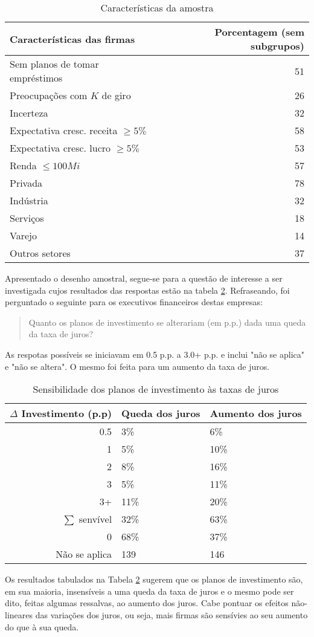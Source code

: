 \documentclass[11pt]{article}
\begin{document}
\begin{table}[htbp]
\caption{\label{tab:amostra}Características da amostra}
\centering
\begin{tabular}{lr}
\hline
Características das firmas & Porcentagem (sem subgrupos)\\
\hline
Sem planos de tomar empréstimos & 51\\
Preocupações com \(K\) de giro & 26\\
\hline
Incerteza & 32\\
Expectativa cresc. receita \(\geq 5\%\) & 58\\
Expectativa cresc. lucro \(\geq 5\%\) & 53\\
Renda \(\leq 100 Mi\) & 57\\
Privada & 78\\
\hline
Indústria & 32\\
Serviços & 18\\
Varejo & 14\\
Outros setores & 37\\
\hline
\end{tabular}
\end{table}

Apresentado o desenho amostral, segue-se para a questão de interesse a ser investigada cujos resultados das respostas estão na tabela \ref{tab:resultsQ}.
Refraseando, foi perguntado o seguinte para os executivos financeiros destas empresas:

\begin{quote}
Quanto os planos de investimento se alterariam (em p.p.) dada uma queda da taxa de juros?
\end{quote}
As respotas possíveis se iniciavam em 0.5 p.p. a 3.0+ p.p. e inclui "não se aplica" e "não se altera".
O mesmo foi feita para um aumento da taxa de juros.


\begin{table}[htbp]
\caption{\label{tab:resultsQ}Sensibilidade dos planos de investimento às taxas de juros}
\centering
\begin{tabular}{rll}
\hline
\(\Delta\) Investimento (p.p) & Queda dos juros & Aumento dos juros\\
\hline
0.5 & 3\% & 6\%\\
1 & 5\% & 10\%\\
2 & 8\% & 16\%\\
3 & 5\% & 11\%\\
3+ & 11\% & 20\%\\
\hline
\(\sum\) senvível & 32\% & 63\%\\
\hline
0 & 68\% & 37\%\\
Não se aplica & 139 & 146\\
\hline
\end{tabular}
\end{table}
Os resultados tabulados na Tabela \ref{tab:resultsQ} sugerem que os planos de investimento são, em sua maioria, insensíveis a uma queda da taxa de juros e o mesmo pode ser dito, feitas algumas ressalvas, ao aumento dos juros.
Cabe pontuar os efeitos não-lineares das variações dos juros, ou seja, mais firmas são sensívies ao seu aumento do que à sua queda.
\end{document}
